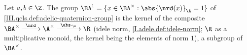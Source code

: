 Let $a,b\in\Z$. The group $\BA^1=\{x\in\BA^\times:\abs{\nrd(x)}_\A=1\}$ of \cref{III.qcls.def:adelic-quaternion-group} is the kernel of the composite
$\BA^\times\xrightarrow{\ \nrd\ }\A^\times\xrightarrow{\ \abs\cdot_\A\ }\R$ (idele norm, \cref{I.adele.def:idele-norm}; $\R$ as a multiplicative monoid, the kernel being the elements of norm $1$), a subgroup of $\BA^\times$.
